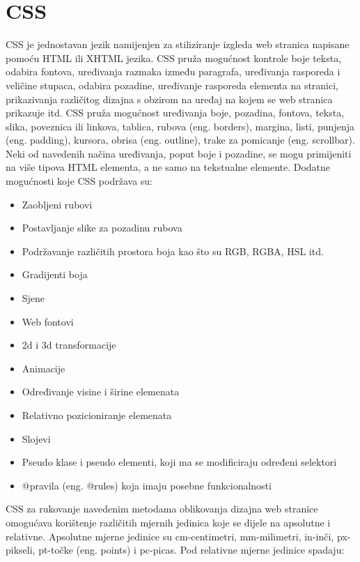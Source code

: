 \documentclass[12pt, oneside, onecolumn]{book}
\begin{document}
{\section{CSS}
CSS je jednostavan jezik namijenjen za stiliziranje izgleda web stranica napisane pomoću HTML ili XHTML jezika. CSS pruža mogućnost kontrole boje teksta, odabira fontova, uređivanja razmaka između paragrafa, uređivanja rasporeda i veličine stupaca, odabira pozadine, uređivanje rasporeda elementa na stranici, prikazivanja različitog dizajna s obzirom na uređaj na kojem se web stranica prikazuje itd. CSS pruža mogućnost uređivanja boje, pozadina, fontova, teksta, slika, poveznica ili linkova, tablica, rubova (eng. borders), margina, listi, punjenja (eng. padding), kursora, obrisa (eng. outline), trake za pomicanje (eng. scrollbar). Neki od navedenih načina uređivanja, poput boje i pozadine, se mogu primijeniti na više tipova HTML elementa, a ne samo na tekstualne elemente. Dodatne mogućnosti koje CSS podržava su: 

\begin{itemize}
\item Zaobljeni rubovi
\item Postavljanje slike za pozadinu rubova
\item Podržavanje različitih prostora boja kao što su RGB, RGBA, HSL itd.
\item Gradijenti boja
\item Sjene
\item Web fontovi
\item 2d i 3d transformacije
\item Animacije
\item Određivanje visine i širine elemenata
\item Relativno pozicioniranje elemenata
\item Slojevi
\item Pseudo klase i pseudo elementi, koji ma se modificiraju određeni selektori
\item @pravila (eng. @rules) koja imaju posebne funkcionalnosti
\end{itemize}

CSS za rukovanje navedenim metodama oblikovanja dizajna web stranice omogućava korištenje različitih mjernih jedinica koje se dijele na apsolutne i relativne. Apsolutne mjerne jedinice su cm-centimetri, mm-milimetri, in-inči, px-pikseli, pt-točke (eng. points) i pc-picas. Pod relativne mjerne jedinice spadaju: 

}
\end{document}
